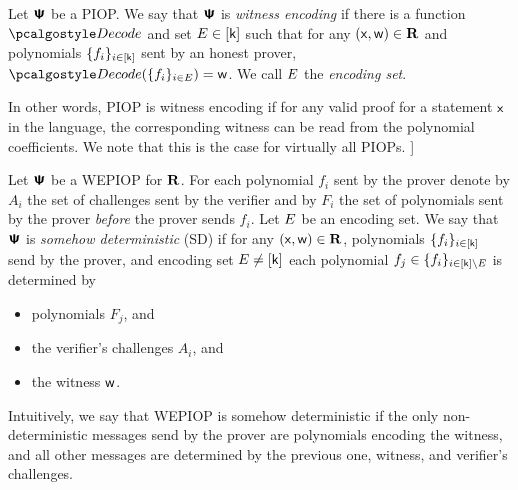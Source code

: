 \documentclass[runningheads,11pt]{llncs}
\begin{document}

\begin{definition}
  \label{def:wepiop}
  Let $\bm{\mathsf{\Psi}}$ be a PIOP.  We say that $\bm{\mathsf{\Psi}}$ is \emph{witness encoding} if there is
  a function $\decode$ and set $E \in [\mathsf{k}]$ such that for any
  $(\mathsf{x}, \mathsf{w}) \in \mathbf{R}$ and polynomials $\{f_i\}_{i \in [\mathsf{k}]}$ sent by an
  honest prover, $\decode(\smallset{f_i}_{i \in \encset}) = \wit$. We call $E$ the
  \emph{encoding set}.
\end{definition}
In other words, PIOP is witness encoding if for any valid proof for a statement
$\mathsf{x}$ in the language, the corresponding witness can be read from the
polynomial coefficients. We note that this is the case for virtually all
PIOPs. ]

\begin{definition}
  \label{def:sdwepiop}
  Let $\bm{\mathsf{\Psi}}$ be a WEPIOP for $\mathbf{R}$. For each polynomial $f_i$ sent by the prover
  denote by $A_i$ the set of challenges sent by the verifier and by $F_i$ the
  set of polynomials sent by the prover \emph{before} the prover sends
  $f_i$. Let $E$ be an encoding set. We say that $\bm{\mathsf{\Psi}}$ is \emph{somehow
    deterministic} (SD) if for any $(\mathsf{x}, \mathsf{w}) \in \mathbf{R}$, polynomials
  $\{f_i\}_{i \in [\mathsf{k}]}$ send by the prover, and encoding set
  $E \neq [\mathsf{k}]$ each polynomial
  $f_j \in \{f_i\}_{i \in [\mathsf{k}] \setminus E}$ is determined by
  \begin{itemize}
    \item polynomials $F_j$, and
    \item the verifier's challenges $A_i$, and
    \item the witness $\mathsf{w}$.
  \end{itemize}
\end{definition}
Intuitively, we say that WEPIOP is somehow deterministic if the only
non-deterministic messages send by the prover are polynomials encoding the
witness, and all other messages are determined by the previous one, witness, and
verifier's challenges.
\end{document}
